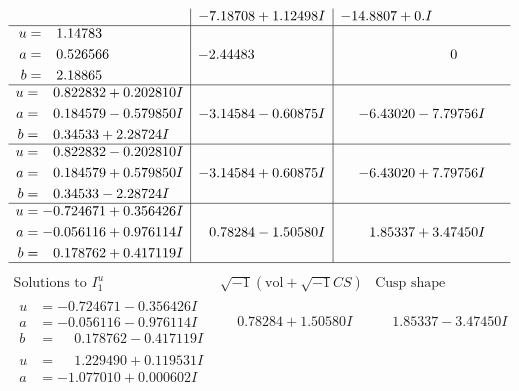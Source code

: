 \documentclass[1p]{elsarticle_modified}
\theoremstyle{definition}
\newcommand{\I}{\sqrt{-1}}
\begin{document}
$$\begin{array}{c|c|c}
 & -7.18708 + 1.12498 I & -14.8807 + 0. I\phantom{ +0.000000I} \\ \hline\begin{aligned}
u &= \phantom{-}1.14783\phantom{ +0.000000I} \\
a &= \phantom{-}0.526566\phantom{ +0.000000I} \\
b &= \phantom{-}2.18865\phantom{ +0.000000I}\end{aligned}
 & -2.44483\phantom{ +0.000000I} & \phantom{-0.000000 } 0 \\ \hline\begin{aligned}
u &= \phantom{-}0.822832 + 0.202810 I \\
a &= \phantom{-}0.184579 - 0.579850 I \\
b &= \phantom{-}0.34533 + 2.28724 I\end{aligned}
 & -3.14584 - 0.60875 I & -6.43020 - 7.79756 I \\ \hline\begin{aligned}
u &= \phantom{-}0.822832 - 0.202810 I \\
a &= \phantom{-}0.184579 + 0.579850 I \\
b &= \phantom{-}0.34533 - 2.28724 I\end{aligned}
 & -3.14584 + 0.60875 I & -6.43020 + 7.79756 I \\ \hline\begin{aligned}
u &= -0.724671 + 0.356426 I \\
a &= -0.056116 + 0.976114 I \\
b &= \phantom{-}0.178762 + 0.417119 I\end{aligned}
 & \phantom{-}0.78284 - 1.50580 I & \phantom{-}1.85337 + 3.47450 I\\
 \hline 
 \end{array}$$\newpage$$\begin{array}{c|c|c}  
\text{Solutions to }I^u_{1}& \I (\text{vol} + \sqrt{-1}CS) & \text{Cusp shape}\\
 \hline 
\begin{aligned}
u &= -0.724671 - 0.356426 I \\
a &= -0.056116 - 0.976114 I \\
b &= \phantom{-}0.178762 - 0.417119 I\end{aligned}
 & \phantom{-}0.78284 + 1.50580 I & \phantom{-}1.85337 - 3.47450 I \\ \hline\begin{aligned}
u &= \phantom{-}1.229490 + 0.119531 I \\
a &= -1.077010 + 0.000602 I \\

\end{aligned}
\end{array}$$
\end{document}
